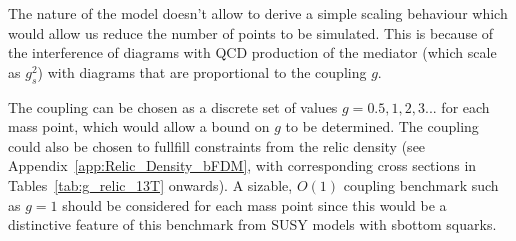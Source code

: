 The nature of the model doesn't allow to derive a simple scaling behaviour which would allow us reduce the number of points to be simulated. This is because of the interference of diagrams with QCD production of the mediator (which scale as $g^2_s$) with diagrams that are proportional to the coupling $g$.~

The coupling can be chosen as a discrete set of values $g=0.5,1,2,3...$ for each mass point, which would allow a bound on $g$ to be determined.  The coupling could also be chosen to fullfill constraints from the relic density (see Appendix~\ref{app:Relic_Density_bFDM}, with corresponding cross sections in Tables~\ref{tab:g_relic_13T} onwards). A sizable, $O(1)$ coupling benchmark such as $g=1$ should be considered for each mass point since this would be a distinctive feature of this benchmark from SUSY models with sbottom squarks.

